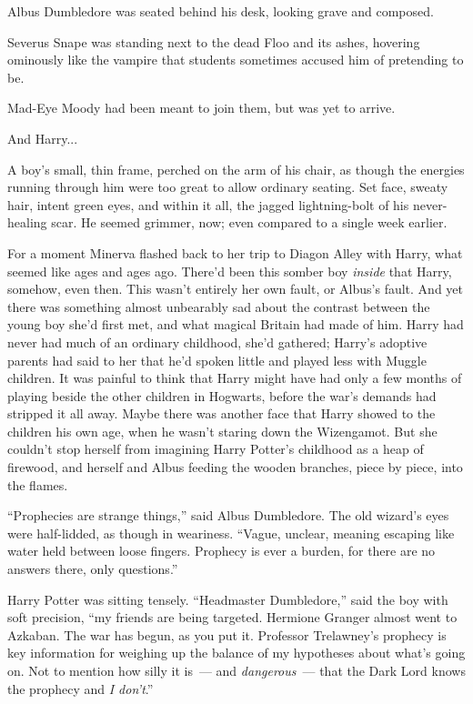 Albus Dumbledore was seated behind his desk, looking grave and composed.

Severus Snape was standing next to the dead Floo and its ashes, hovering ominously like the vampire that students sometimes accused him of pretending to be.

Mad-Eye Moody had been meant to join them, but was yet to arrive.

And Harry...

A boy's small, thin frame, perched on the arm of his chair, as though the energies running through him were too great to allow ordinary seating. Set face, sweaty hair, intent green eyes, and within it all, the jagged lightning-bolt of his never-healing scar. He seemed grimmer, now; even compared to a single week earlier.

For a moment Minerva flashed back to her trip to Diagon Alley with Harry, what seemed like ages and ages ago. There'd been this somber boy \emph{inside} that Harry, somehow, even then. This wasn't entirely her own fault, or Albus's fault. And yet there was something almost unbearably sad about the contrast between the young boy she'd first met, and what magical Britain had made of him. Harry had never had much of an ordinary childhood, she'd gathered; Harry's adoptive parents had said to her that he'd spoken little and played less with Muggle children. It was painful to think that Harry might have had only a few months of playing beside the other children in Hogwarts, before the war's demands had stripped it all away. Maybe there was another face that Harry showed to the children his own age, when he wasn't staring down the Wizengamot. But she couldn't stop herself from imagining Harry Potter's childhood as a heap of firewood, and herself and Albus feeding the wooden branches, piece by piece, into the flames.

``Prophecies are strange things,'' said Albus Dumbledore. The old wizard's eyes were half-lidded, as though in weariness. ``Vague, unclear, meaning escaping like water held between loose fingers. Prophecy is ever a burden, for there are no answers there, only questions.''

Harry Potter was sitting tensely. ``Headmaster Dumbledore,'' said the boy with soft precision, ``my friends are being targeted. Hermione Granger almost went to Azkaban. The war has begun, as you put it. Professor Trelawney's prophecy is key information for weighing up the balance of my hypotheses about what's going on. Not to mention how silly it is~--- and \emph{dangerous}~--- that the Dark Lord knows the prophecy and \emph{I don't}.''

